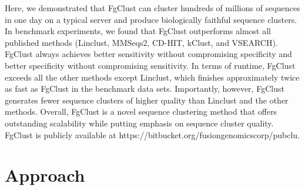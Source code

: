 \documentclass[11pt,letterpaper]{article}
\begin{document}
Here, we demonstrated that FgClust can cluster hundreds of millions of sequences in one day on a typical server and produce biologically faithful sequence clusters. In benchmark experiments, we found that FgClust outperforms almost all published methods (Linclust, MMSeqs2, CD-HIT, kClust, and VSEARCH). FgClust always achieves better sensitivity without compromising specificity and better specificity without compromising sensitivity. In terms of runtime, FgClust exceeds all the other methods except Linclust, which finishes approximately twice as fast as FgClust in the benchmark data sets. Importantly, however, FgClust generates fewer sequence clusters of higher quality than Linclust and the other methods. Overall, FgClust is a novel sequence clustering method that offers outstanding scalability while putting emphasis on sequence cluster quality. FgClust is publicly available at https://bitbucket.org/fusiongenomicscorp/pubclu.

\section{Approach}

\end{document}
